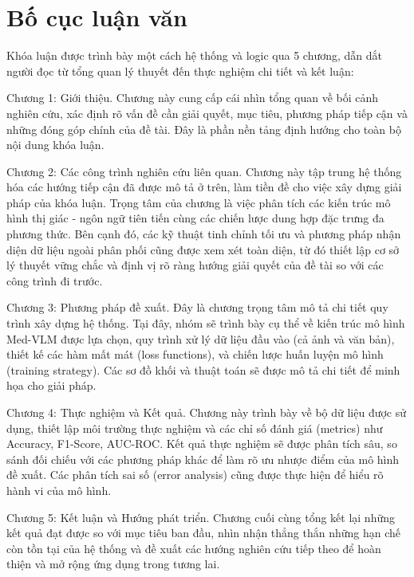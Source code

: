 \section{Bố cục luận văn}
Khóa luận được trình bày một cách hệ thống và logic qua 5 chương, dẫn dắt người đọc từ tổng quan lý thuyết đến thực nghiệm chi tiết và kết luận:

Chương 1: Giới thiệu. Chương này cung cấp cái nhìn tổng quan về bối cảnh nghiên cứu, xác định rõ vấn đề cần giải quyết, mục tiêu, phương pháp tiếp cận và những đóng góp chính của đề tài. Đây là phần nền tảng định hướng cho toàn bộ nội dung khóa luận.

Chương 2: Các công trình nghiên cứu liên quan. Chương này tập trung hệ thống hóa các hướng tiếp cận đã được mô tả ở trên, làm tiền đề cho việc xây dựng giải pháp của khóa luận. Trọng tâm của chương là việc phân tích các kiến trúc mô hình thị giác - ngôn ngữ tiên tiến cùng các chiến lược dung hợp đặc trưng đa phương thức. Bên cạnh đó, các kỹ thuật tinh chỉnh tối ưu và phương pháp nhận diện dữ liệu ngoài phân phối cũng được xem xét toàn diện, từ đó thiết lập cơ sở lý thuyết vững chắc và định vị rõ ràng hướng giải quyết của đề tài so với các công trình đi trước.

Chương 3: Phương pháp đề xuất. Đây là chương trọng tâm mô tả chi tiết quy trình xây dựng hệ thống. Tại đây, nhóm sẽ trình bày cụ thể về kiến trúc mô hình Med-VLM được lựa chọn, quy trình xử lý dữ liệu đầu vào (cả ảnh và văn bản), thiết kế các hàm mất mát (loss functions), và chiến lược huấn luyện mô hình (training strategy). Các sơ đồ khối và thuật toán sẽ được mô tả chi tiết để minh họa cho giải pháp.

Chương 4: Thực nghiệm và Kết quả. Chương này trình bày về bộ dữ liệu được sử dụng, thiết lập môi trường thực nghiệm và các chỉ số đánh giá (metrics) như Accuracy, F1-Score, AUC-ROC. Kết quả thực nghiệm sẽ được phân tích sâu, so sánh đối chiếu với các phương pháp khác để làm rõ ưu nhược điểm của mô hình đề xuất. Các phân tích sai số (error analysis) cũng được thực hiện để hiểu rõ hành vi của mô hình.

Chương 5: Kết luận và Hướng phát triển. Chương cuối cùng tổng kết lại những kết quả đạt được so với mục tiêu ban đầu, nhìn nhận thẳng thắn những hạn chế còn tồn tại của hệ thống và đề xuất các hướng nghiên cứu tiếp theo để hoàn thiện và mở rộng ứng dụng trong tương lai.